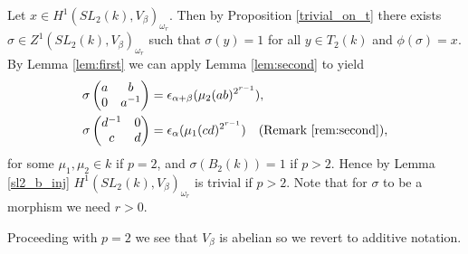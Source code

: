 Let $x\in H^1(SL_2(k), V_\beta)_{\omega_r}$. Then by Proposition \ref{trivial_on_t} there exists $\sigma \in Z^1(SL_2(k), V_\beta)_{\omega_r}$ such that $\sigma(y) = 1$ for all  $y\in T_2(k)$ and $\phi(\sigma) = x$. By Lemma \ref{lem:first} we can apply Lemma \ref{lem:second} to yield
\begin{align*}
\sigma\left(\begin{matrix}a & b\\0 & a^{-1}\end{matrix}\right) &= \epsilon_{\alpha+\beta}(\mu_2(ab)^{2^{r-1}}),\\
\sigma\left(\begin{matrix}d^{-1} & 0\\c & d\end{matrix}\right) &= \epsilon_{\alpha}(\mu_1(cd)^{2^{r-1}}) \quad\textrm{(Remark \ref{rem:second})},
\end{align*}
for some $\mu_1,\mu_2 \in k$ if $p = 2$, and $\sigma(B_2(k)) = 1$ if $p>2$. Hence by Lemma \ref{sl2_b_inj} $H^1(SL_2(k), V_\beta)_{\omega_r}$ is trivial if $p > 2$.
Note that for $\sigma$ to be a morphism we need $r>0$.

Proceeding with $p=2$ we see that $V_\beta$ is abelian so we revert to additive notation.

